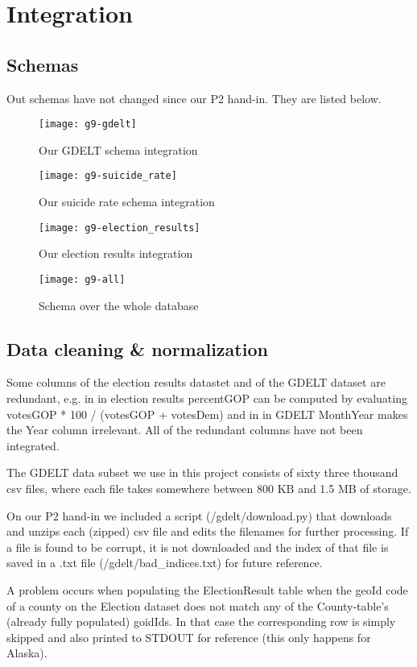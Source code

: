 \section{Integration}


\subsection{Schemas}
Out schemas have not changed since our P2 hand-in. They are listed below.

\begin{figure}
	\centering
	\texttt{[image: g9-gdelt]}
	\caption{Our GDELT schema integration}
	\label{fig:gdelt}
\end{figure}

\begin{figure}
	\centering
	\texttt{[image: g9-suicide\_rate]}
	\caption{Our suicide rate schema integration}
	\label{fig:suicide_rate}
\end{figure}

\begin{figure}
	\centering
	\texttt{[image: g9-election\_results]}
	\caption{Our election results integration}
	\label{fig:election_results}
\end{figure}

\begin{figure}
	\centering
	\texttt{[image: g9-all]}
	\caption{Schema over the whole database}
	\label{fig:all}
\end{figure}

\subsection{Data cleaning \& normalization}
Some columns of the election results datastet and of the GDELT
dataset are redundant, e.g. in in election results percentGOP
can be computed by evaluating votesGOP * 100 / (votesGOP + votesDem)
and in in GDELT MonthYear makes the Year column irrelevant.
All of the redundant columns have not been integrated.

The GDELT data subset we use in this project consists of sixty
three thousand csv files, where each file takes somewhere between
800 KB and 1.5 MB of storage.

On our P2 hand-in we included a script
(/gdelt/download.py) that downloads and unzips each (zipped) csv file
and edits the filenames for further processing.
If a file is found to be corrupt, it is not downloaded and
the index of that file is saved in a .txt file
(/gdelt/bad\_indices.txt) for future reference.

A problem occurs when populating the ElectionResult table when
the geoId code of a county on the Election dataset does not
match any of the County-table's (already fully populated) goidIds.
In that case the corresponding
row is simply skipped and also printed to STDOUT for reference
(this only happens for Alaska).
